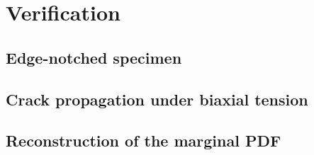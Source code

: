 \section{Verification}
\label{section: cohesive/verification}

\subsection{Edge-notched specimen}

\subsection{Crack propagation under biaxial tension}

\subsection{Reconstruction of the marginal PDF}
